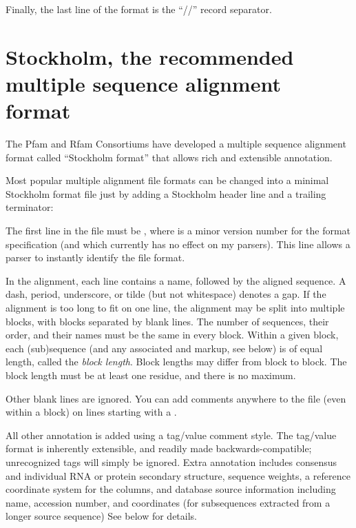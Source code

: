 Finally, the last line of the format is the ``//'' record separator.

\newpage
\section{Stockholm, the recommended multiple sequence alignment format}
\label{section:stockholm}

The Pfam and Rfam Consortiums have developed a multiple sequence
alignment format called ``Stockholm format'' that allows rich and
extensible annotation. 

Most popular multiple alignment file formats can be changed into a
minimal Stockholm format file just by adding a Stockholm header line
and a trailing \mono{//} terminator:


The first line in the file must be , where
 is a minor version number for the format specification (and
which currently has no effect on my parsers). This line allows a
parser to instantly identify the file format.

In the alignment, each line contains a name, followed by the aligned
sequence. A dash, period, underscore, or tilde (but not whitespace)
denotes a gap. If the alignment is too long to fit on one line, the
alignment may be split into multiple blocks, with blocks separated by
blank lines. The number of sequences, their order, and their names
must be the same in every block. Within a given block, each
(sub)sequence (and any associated  and  markup,
see below) is of equal length, called the \emph{block length}. Block
lengths may differ from block to block. The block length must be at
least one residue, and there is no maximum.

Other blank lines are ignored. You can add comments anywhere to the
file (even within a block) on lines starting with a \mono{\#}.

All other annotation is added using a tag/value comment style. The
tag/value format is inherently extensible, and readily made
backwards-compatible; unrecognized tags will simply be ignored. Extra
annotation includes consensus and individual RNA or protein secondary
structure, sequence weights, a reference coordinate system for the
columns, and database source information including name, accession
number, and coordinates (for subsequences extracted from a longer
source sequence) See below for details.

